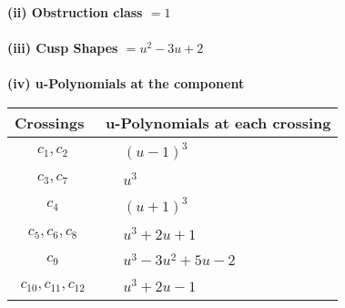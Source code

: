 \documentclass[1p]{elsarticle_modified}
\theoremstyle{definition}
\begin{document}
\flushleft \textbf{(ii) Obstruction class $= 1$}\\~\\
\flushleft \textbf{(iii) Cusp Shapes $= u^2-3 u+2$}\\~\\
\newpage\renewcommand{\arraystretch}{1}
\flushleft \textbf{(iv) u-Polynomials at the component}\newline \\
\begin{tabular}{m{50pt}|m{274pt}}
Crossings & \hspace{64pt}u-Polynomials at each crossing \\
\hline $$\begin{aligned}c_{1},c_{2}\end{aligned}$$&$\begin{aligned}
&(u-1)^3
\end{aligned}$\\
\hline $$\begin{aligned}c_{3},c_{7}\end{aligned}$$&$\begin{aligned}
&u^3
\end{aligned}$\\
\hline $$\begin{aligned}c_{4}\end{aligned}$$&$\begin{aligned}
&(u+1)^3
\end{aligned}$\\
\hline $$\begin{aligned}c_{5},c_{6},c_{8}\end{aligned}$$&$\begin{aligned}
&u^3+2 u+1
\end{aligned}$\\
\hline $$\begin{aligned}c_{9}\end{aligned}$$&$\begin{aligned}
&u^3-3 u^2+5 u-2
\end{aligned}$\\
\hline $$\begin{aligned}c_{10},c_{11},c_{12}\end{aligned}$$&$\begin{aligned}
&u^3+2 u-1
\end{aligned}$\\
\hline
\end{tabular}\\~\\
\newpage\renewcommand{\arraystretch}{1}
\end{document}
